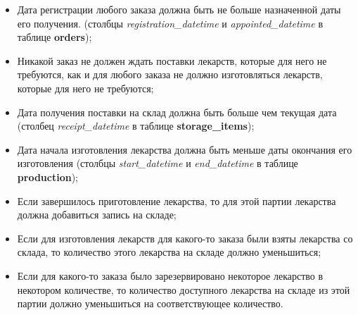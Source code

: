 \documentclass[a4paper]{article}
\newcommand{\dbtable}[1]{\textbf{#1}}
\newcommand{\dbtableref}[1]{\textit{#1}}
\begin{document}
\begin{itemize}
				\item Дата регистрации любого заказа должна быть не больше назначенной даты его получения. (столбцы \dbtableref{registration\_datetime} и \dbtableref{appointed\_datetime} в таблице \dbtable{orders});
				
				\item Никакой заказ не должен ждать поставки лекарств, которые для него не требуются, как и для любого заказа не должно изготовляться лекарств, которые для него не требуются;
					
				\item Дата получения поставки на склад должна быть больше чем текущая дата (столбец \dbtableref{receipt\_datetime} в таблице \dbtable{storage\_items});
				
				\item Дата начала изготовления лекарства должна быть меньше даты окончания его изготовления (столбцы \dbtableref{start\_datetime} и \dbtableref{end\_datetime} в таблице \dbtable{production});
				
				\item Если завершилось приготовление лекарства, то для этой партии лекарства должна добавиться запись на складе;
			
				\item Если для изготовления лекарств для какого-то заказа были взяты лекарства со склада, то количество этого лекарства на складе должно уменьшиться;
			
				\item Если для какого-то заказа было зарезервировано некоторое лекарство в некотором количестве, то количество доступного лекарства на складе из этой партии должно уменьшиться на соответствующее количество.
			\end{itemize}
	\newpage
\end{document}
